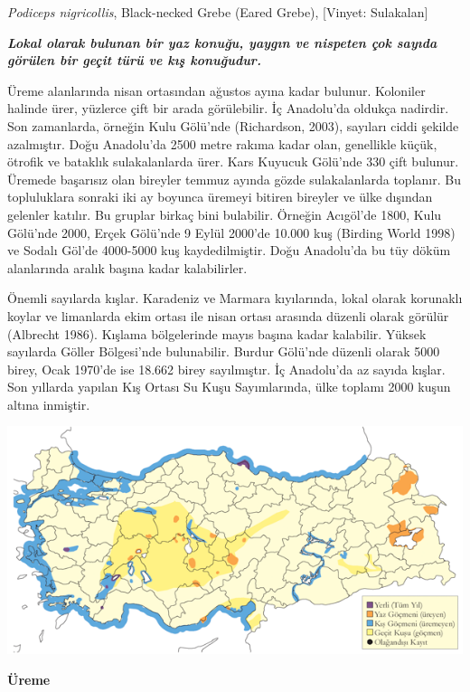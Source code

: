 \documentclass[
  a4paper,
  DIV=11,
  numbers=noendperiod]{scrreprt}
\begin{document}
\emph{Podiceps nigricollis}, Black-necked Grebe (Eared Grebe),
{[}Vinyet: Sulakalan{]}

\textbf{\emph{Lokal olarak bulunan bir yaz konuğu, yaygın ve nispeten
çok sayıda görülen bir geçit türü ve kış konuğudur.}}

Üreme alanlarında nisan ortasından ağustos ayına kadar bulunur.
Koloniler halinde ürer, yüzlerce çift bir arada görülebilir. İç
Anadolu'da oldukça nadirdir. Son zamanlarda, örneğin Kulu Gölü'nde
(Richardson, 2003), sayıları ciddi şekilde azalmıştır. Doğu Anadolu'da
2500 metre rakıma kadar olan, genellikle küçük, ötrofik ve bataklık
sulakalanlarda ürer. Kars Kuyucuk Gölü'nde 330 çift bulunur. Üremede
başarısız olan bireyler temmuz ayında gözde sulakalanlarda toplanır. Bu
topluluklara sonraki iki ay boyunca üremeyi bitiren bireyler ve ülke
dışından gelenler katılır. Bu gruplar birkaç bini bulabilir. Örneğin
Acıgöl'de 1800, Kulu Gölü'nde 2000, Erçek Gölü'nde 9 Eylül 2000'de
10.000 kuş (Birding World 1998) ve Sodalı Göl'de 4000-5000 kuş
kaydedilmiştir. Doğu Anadolu'da bu tüy döküm alanlarında aralık başına
kadar kalabilirler.

Önemli sayılarda kışlar. Karadeniz ve Marmara kıyılarında, lokal olarak
korunaklı koylar ve limanlarda ekim ortası ile nisan ortası arasında
düzenli olarak görülür (Albrecht 1986). Kışlama bölgelerinde mayıs
başına kadar kalabilir. Yüksek sayılarda Göller Bölgesi'nde bulunabilir.
Burdur Gölü'nde düzenli olarak 5000 birey, Ocak 1970'de ise 18.662 birey
sayılmıştır. İç Anadolu'da az sayıda kışlar. Son yıllarda yapılan Kış
Ortası Su Kuşu Sayımlarında, ülke toplamı 2000 kuşun altına inmiştir.

\includegraphics{images/harita_Page_055.png}

\textbf{Üreme}
\end{document}
